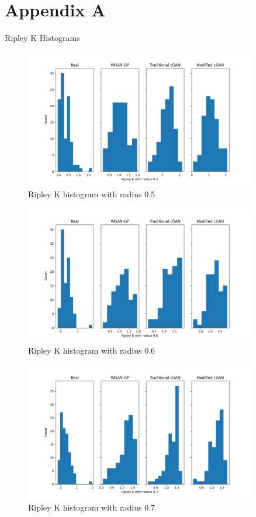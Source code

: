 \documentclass{Configuration_Files/PoliMi3i_thesis}
\begin{document}
\chapter{Appendix A}
\label{appendixa}
\begin{large}
Ripley K Histograms
\end{large}
\begin{figure}[H]
    \centering
    \includegraphics[width=0.9\textwidth]{ripk_5.jpg}
    \caption{Ripley K histogram with radius 0.5}
    \label{fig:ripk5}
\end{figure}
\begin{figure}[H]
    \centering
    \includegraphics[width=0.9\textwidth]{ripk_6.jpg}
    \caption{Ripley K histogram with radius 0.6}
    \label{fig:ripk6}
\end{figure}
\begin{figure}[H]
    \centering
    \includegraphics[width=0.9\textwidth]{ripk_7.jpg}
    \caption{Ripley K histogram with radius 0.7}
    \label{fig:ripk7}
\end{figure}
\end{document}
